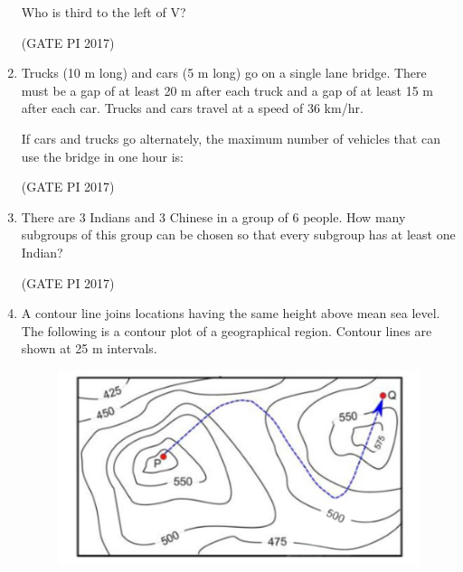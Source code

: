 \documentclass[journal,12pt,onecolumn]{IEEEtran}
\theoremstyle{remark}
\begin{document}
\begin{enumerate}
Who is third to the left of V?
\begin{enumerate}
\end{enumerate}
\hfill (GATE PI 2017)

\item Trucks (10 m long) and cars (5 m long) go on a single lane bridge.  
There must be a gap of at least 20 m after each truck and a gap of at least 15 m after each car.  
Trucks and cars travel at a speed of 36 km/hr.  

If cars and trucks go alternately, the maximum number of vehicles that can use the bridge in one hour is:
\begin{enumerate}
\end{enumerate}
\hfill (GATE PI 2017)

\item There are 3 Indians and 3 Chinese in a group of 6 people.  
How many subgroups of this group can be chosen so that every subgroup has at least one Indian?
\begin{enumerate}
\end{enumerate}
\hfill (GATE PI 2017)

\item A contour line joins locations having the same height above mean sea level.  
The following is a contour plot of a geographical region. Contour lines are shown at 25 m intervals.  

\begin{figure}[H]
    \centering
    \includegraphics[width=0.5\columnwidth]{fig12.png}
    \caption{}
    \label{fig:placeholder}
\end{figure}


\end{enumerate}
\end{document}
